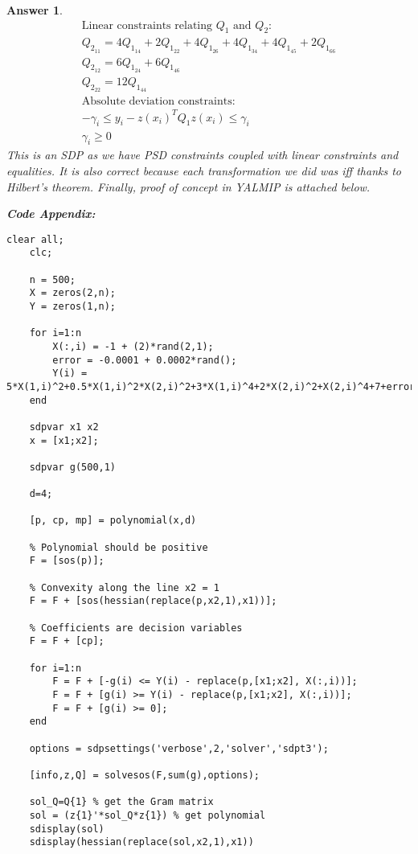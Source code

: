 \documentclass[12pt]{article}
\theoremstyle{colon}
\newtheorem*{answer}{Answer}
\begin{document}
\begin{answer}
\begin{gather*}
    \text{Linear constraints relating $Q_1$ and $Q_2$:} \\
    Q_{2_{11}} = 4Q_{1_{14}} + 2Q_{1_{22}} + 4Q_{1_{26}} + 4Q_{1_{34}} + 4Q_{1_{45}} + 2Q_{1_{66}} \\
    Q_{2_{12}} = 6Q_{1_{24}} + 6Q_{1_{46}} \\
    Q_{2_{22}} = 12Q_{1_{44}} \\
    \text{Absolute deviation constraints:} \\
    -\gamma_i \leq y_i - z(x_i)^T Q_1 z(x_i) \leq \gamma_i \\
    \gamma_i \geq 0
  \end{gather*}
  This is an SDP as we have PSD constraints coupled with linear constraints and equalities. It is also correct because each transformation we did was iff thanks to Hilbert's theorem. Finally, proof of concept in YALMIP is attached below.

  \textbf{Code Appendix:}

  \begin{lstlisting}[style=Matlab-editor, basicstyle=\scriptsize]
    clear all;
    clc;

    n = 500;
    X = zeros(2,n);
    Y = zeros(1,n);

    for i=1:n
        X(:,i) = -1 + (2)*rand(2,1);
        error = -0.0001 + 0.0002*rand();
        Y(i) = 5*X(1,i)^2+0.5*X(1,i)^2*X(2,i)^2+3*X(1,i)^4+2*X(2,i)^2+X(2,i)^4+7+error;
    end

    sdpvar x1 x2
    x = [x1;x2];

    sdpvar g(500,1)

    d=4;

    [p, cp, mp] = polynomial(x,d)

    % Polynomial should be positive
    F = [sos(p)];

    % Convexity along the line x2 = 1
    F = F + [sos(hessian(replace(p,x2,1),x1))];

    % Coefficients are decision variables
    F = F + [cp];

    for i=1:n
        F = F + [-g(i) <= Y(i) - replace(p,[x1;x2], X(:,i))];
        F = F + [g(i) >= Y(i) - replace(p,[x1;x2], X(:,i))];
        F = F + [g(i) >= 0];
    end

    options = sdpsettings('verbose',2,'solver','sdpt3');

    [info,z,Q] = solvesos(F,sum(g),options);

    sol_Q=Q{1} % get the Gram matrix
    sol = (z{1}'*sol_Q*z{1}) % get polynomial
    sdisplay(sol)
    sdisplay(hessian(replace(sol,x2,1),x1))
  \end{lstlisting}
\end{answer}
\end{document}
